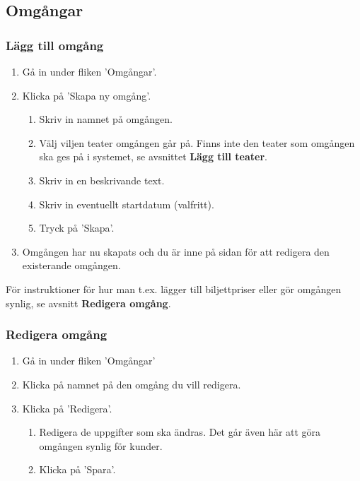 \documentclass[a4paper, twoside, 11pt, titlepage]{article}
\begin{document}
	\subsection{Omgångar}



		\subsubsection{Lägg till omgång}


		\begin{enumerate}
		\item Gå in under fliken 'Omgångar'.

		\item Klicka på 'Skapa ny omgång'.

		\begin{enumerate}
		\item Skriv in namnet på omgången.

		\item Välj viljen teater omgången går på. Finns inte den teater som omgången ska ges på i systemet, se avsnittet \textbf{Lägg till teater}.

		\item Skriv in en beskrivande text.

		\item Skriv in eventuellt startdatum (valfritt).

		\item Tryck på 'Skapa'.
		\end{enumerate}

		\item Omgången har nu skapats och du är inne på sidan för att redigera den existerande omgången.
		\end{enumerate}

		För instruktioner för hur man t.ex. lägger till biljettpriser eller gör omgången synlig, se avsnitt \textbf{Redigera omgång}.

		\subsubsection{Redigera omgång}


		\begin{enumerate}
		\item Gå in under fliken 'Omgångar'

		\item Klicka på namnet på den omgång du vill redigera.

		\item Klicka på 'Redigera'.

		\begin{enumerate}
		\item Redigera de uppgifter som ska ändras. Det går även här att göra omgången synlig för kunder.

		\item Klicka på 'Spara'.
		\end{enumerate}
		\end{enumerate}
\end{document}
